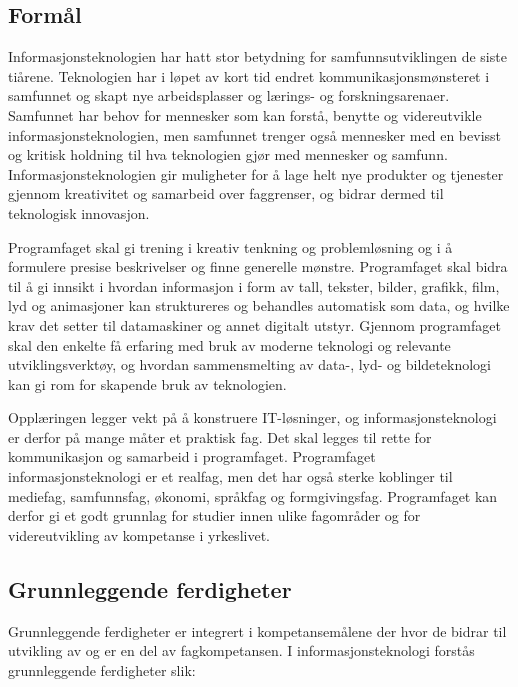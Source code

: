 \documentclass[%
oneside,                 %
final,                   %
12pt]{article}
\begin{document}
\subsection{Formål}

Informasjonsteknologien har hatt stor betydning for
samfunnsutviklingen de siste tiårene. Teknologien har i løpet av kort
tid endret kommunikasjonsmønsteret i samfunnet og skapt nye
arbeidsplasser og lærings- og forskningsarenaer. Samfunnet har behov
for mennesker som kan forstå, benytte og videreutvikle
informasjonsteknologien, men samfunnet trenger også mennesker med en
bevisst og kritisk holdning til hva teknologien gjør med mennesker og
samfunn. Informasjonsteknologien gir muligheter for å lage helt nye
produkter og tjenester gjennom kreativitet og samarbeid over
faggrenser, og bidrar dermed til teknologisk innovasjon.

Programfaget skal gi trening i kreativ tenkning og problemløsning og
i å formulere presise beskrivelser og finne generelle
mønstre. Programfaget skal bidra til å gi innsikt i hvordan
informasjon i form av tall, tekster, bilder, grafikk, film, lyd og
animasjoner kan struktureres og behandles automatisk som data, og
hvilke krav det setter til datamaskiner og annet digitalt
utstyr. Gjennom programfaget skal den enkelte få erfaring med bruk av
moderne teknologi og relevante utviklingsverktøy, og hvordan
sammensmelting av data-, lyd- og bildeteknologi kan gi rom for
skapende bruk av teknologien.

Opplæringen legger vekt på å konstruere IT-løsninger, og
informasjonsteknologi er derfor på mange måter et praktisk fag. Det
skal legges til rette for kommunikasjon og samarbeid i
programfaget. Programfaget informasjonsteknologi er et realfag, men
det har også sterke koblinger til mediefag, samfunnsfag, økonomi,
språkfag og formgivingsfag. Programfaget kan derfor gi et godt
grunnlag for studier innen ulike fagområder og for videreutvikling av
kompetanse i yrkeslivet.

\subsection{Grunnleggende ferdigheter}

Grunnleggende ferdigheter er integrert i kompetansemålene der hvor de
bidrar til utvikling av og er en del av fagkompetansen. I
informasjonsteknologi forstås grunnleggende ferdigheter slik:
\end{document}
